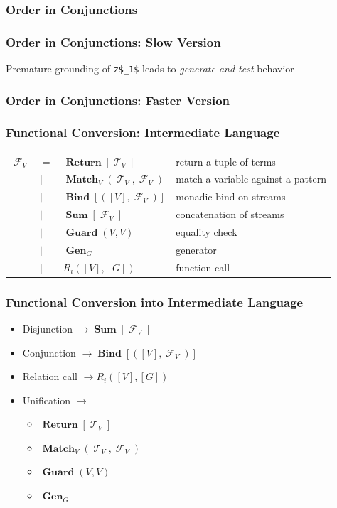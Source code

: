 \documentclass[xcolor=table]{beamer}
\DeclareMathOperator{\Term}{\mathcal{T}}
\DeclareMathOperator{\Fun}{\mathcal{F}}
\DeclareMathOperator{\Rtrn}{\mathbf{Return}}
\DeclareMathOperator{\Bind}{\mathbf{Bind}}
\DeclareMathOperator{\Match}{\mathbf{Match}}
\DeclareMathOperator{\Sum}{\mathbf{Sum}}
\DeclareMathOperator{\Guard}{\mathbf{Guard}}
\DeclareMathOperator{\Gen}{\mathbf{Gen}}
\newcommand{\LIST}[1]{\left[ #1 \right]}
\begin{document}
\begin{frame}[fragile]
  \frametitle{Order in Conjunctions}
  
\end{frame}

\begin{frame}[fragile]
  \frametitle{Order in Conjunctions: Slow Version}
  

  Premature grounding of \lstinline{z$_1$} leads to \emph{generate-and-test} behavior
\end{frame}


\begin{frame}[fragile]
  \frametitle{Order in Conjunctions: Faster Version}
  
\end{frame}

\begin{frame}[fragile]
  \frametitle{Functional Conversion: Intermediate Language}
\begin{tabular}{llll}
    $\Fun_{V}$ & $=$ &  $\Rtrn \LIST{\Term_{V}}$ & return a tuple of terms\\
               & $\mid$ &  $\Match_{V} \left( \Term_{V}, \Fun_{V} \right)$& match a variable against a pattern\\
               & $\mid$ & $\Bind\LIST{\left(\LIST{V}, \Fun_{V}\right)} $ & monadic bind on streams\\
               & $\mid$ & $\Sum\LIST{\Fun_{V}}$ & concatenation of streams\\
               & $\mid$ & $\Guard\left( V, V \right)$ & equality check\\
               & $\mid$ & $\Gen_{G}$ & generator\\
               & $\mid$ & $R_{i}(\LIST{V}, \LIST{G})$ & function call
\end{tabular}
\end{frame}

\begin{frame}[fragile]
  \frametitle{Functional Conversion into Intermediate Language}
\begin{itemize}
  \item Disjunction $\rightarrow \Sum\LIST{\Fun_{V}}$
  \item Conjunction $\rightarrow \Bind\LIST{\left(\LIST{V}, \Fun_{V}\right)}$
  \item Relation call $\rightarrow R_{i}(\LIST{V}, \LIST{G})$
  \item Unification $\rightarrow$
    \begin{itemize}
      \item $\Rtrn \LIST{\Term_{V}}$
      \item $\Match_{V} \left( \Term_{V}, \Fun_{V} \right)$
      \item $\Guard\left( V, V \right)$
      \item $\Gen_{G}$
    \end{itemize}
\end{itemize}
\end{frame}
\end{document}
